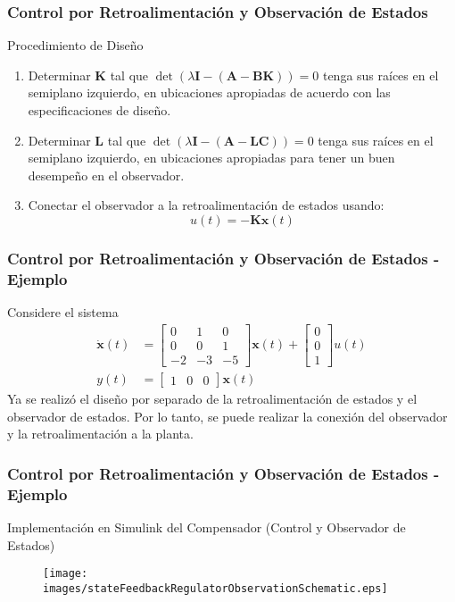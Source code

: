 \documentclass[aspectratio=169,handout]{beamer}
\theoremstyle{definition}
\theoremstyle{plain}
\theoremstyle{remark}
\begin{document}
\begin{frame}[<+->]\frametitle{Control por Retroalimentación y Observación de Estados}
	Procedimiento de Diseño
	\begin{enumerate}
		\item Determinar $\mathbf{K}$ tal que $\det(\lambda \mathbf{I} - (\mathbf{A} - \mathbf{BK})) = 0$ tenga sus raíces en el semiplano izquierdo, en ubicaciones apropiadas de acuerdo con las especificaciones de diseño.
		\item Determinar $\mathbf{L}$ tal que $\det(\lambda \mathbf{I} - (\mathbf{A} - \mathbf{LC})) = 0$ tenga sus raíces en el semiplano izquierdo, en ubicaciones apropiadas para tener un buen desempeño en el observador.
		\item Conectar el observador a la retroalimentación de estados usando:
		\begin{equation*}
			u(t) = - \mathbf{K}\hat{\mathbf{x}}(t)
		\end{equation*}
	\end{enumerate}
\end{frame}

\begin{frame}[c]\frametitle{Control por Retroalimentación y Observación de Estados - Ejemplo}
	Considere el sistema	
	\begin{align*}
		\dot{\mathbf{x}}(t) &=
		\begin{bmatrix}
			0 & 1 & 0\\
			0 & 0 & 1\\
			-2 & -3 & -5
		\end{bmatrix}
		\mathbf{x}(t) +
		\begin{bmatrix}
			0 \\ 0 \\ 1
		\end{bmatrix}u(t)\\
		y(t) &=
		\begin{bmatrix}
			1 & 0 & 0
		\end{bmatrix}
		\mathbf{x}(t)
	\end{align*}
	Ya se realizó el diseño por separado de la retroalimentación de estados y el observador de estados. Por lo tanto, se puede realizar la conexión del observador y la retroalimentación a la planta.
\end{frame}

\begin{frame}[c]\frametitle{Control por Retroalimentación y Observación de Estados - Ejemplo}
	Implementación en Simulink del Compensador (Control y Observador de Estados)
	\begin{figure}
		\centering
		\texttt{[image: images/stateFeedbackRegulatorObservationSchematic.eps]}
	\end{figure}
\end{frame}
\end{document}

